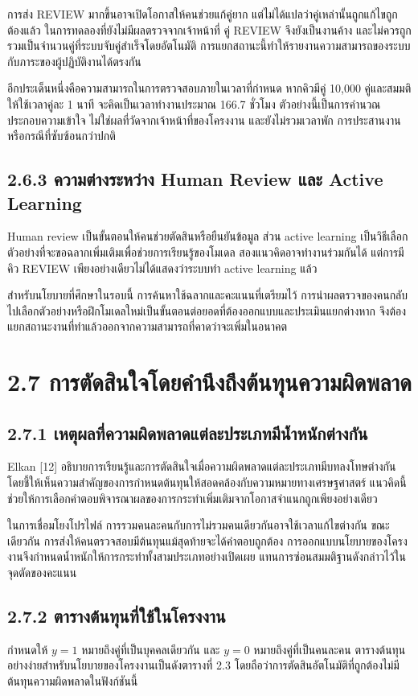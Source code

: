 การส่ง REVIEW มากขึ้นอาจเปิดโอกาสให้คนช่วยแก้คู่ยาก แต่ไม่ได้แปลว่าคู่เหล่านั้นถูกแก้ไขถูกต้องแล้ว ในการทดลองที่ยังไม่มีผลตรวจจากเจ้าหน้าที่ คู่ REVIEW จึงยังเป็นงานค้าง และไม่ควรถูกรวมเป็นจำนวนคู่ที่ระบบจับคู่สำเร็จโดยอัตโนมัติ การแยกสถานะนี้ทำให้รายงานความสามารถของระบบกับภาระของผู้ปฏิบัติงานได้ตรงกัน

อีกประเด็นหนึ่งคือความสามารถในการตรวจสอบภายในเวลาที่กำหนด หากคิวมีคู่ 10,000 คู่และสมมติให้ใช้เวลาคู่ละ 1 นาที จะคิดเป็นเวลาทำงานประมาณ 166.7 ชั่วโมง ตัวอย่างนี้เป็นการคำนวณประกอบความเข้าใจ ไม่ใช่ผลที่วัดจากเจ้าหน้าที่ของโครงงาน และยังไม่รวมเวลาพัก การประสานงาน หรือกรณีที่ซับซ้อนกว่าปกติ

\subsection*{2.6.3 ความต่างระหว่าง Human Review และ Active Learning}
Human review เป็นขั้นตอนให้คนช่วยตัดสินหรือยืนยันข้อมูล ส่วน active learning เป็นวิธีเลือกตัวอย่างที่จะขอฉลากเพิ่มเติมเพื่อช่วยการเรียนรู้ของโมเดล สองแนวคิดอาจทำงานร่วมกันได้ แต่การมีคิว REVIEW เพียงอย่างเดียวไม่ได้แสดงว่าระบบทำ active learning แล้ว

สำหรับนโยบายที่ศึกษาในรอบนี้ การค้นหาใช้ฉลากและคะแนนที่เตรียมไว้ การนำผลตรวจของคนกลับไปเลือกตัวอย่างหรือฝึกโมเดลใหม่เป็นขั้นตอนต่อยอดที่ต้องออกแบบและประเมินแยกต่างหาก จึงต้องแยกสถานะงานที่ทำแล้วออกจากความสามารถที่คาดว่าจะเพิ่มในอนาคต

\section*{2.7 การตัดสินใจโดยคำนึงถึงต้นทุนความผิดพลาด}
\subsection*{2.7.1 เหตุผลที่ความผิดพลาดแต่ละประเภทมีน้ำหนักต่างกัน}
Elkan [12] อธิบายการเรียนรู้และการตัดสินใจเมื่อความผิดพลาดแต่ละประเภทมีบทลงโทษต่างกัน โดยชี้ให้เห็นความสำคัญของการกำหนดต้นทุนให้สอดคล้องกับความหมายทางเศรษฐศาสตร์ แนวคิดนี้ช่วยให้การเลือกคำตอบพิจารณาผลของการกระทำเพิ่มเติมจากโอกาสจำแนกถูกเพียงอย่างเดียว

ในการเชื่อมโยงโปรไฟล์ การรวมคนละคนกับการไม่รวมคนเดียวกันอาจใช้เวลาแก้ไขต่างกัน ขณะเดียวกัน การส่งให้คนตรวจสอบมีต้นทุนแม้สุดท้ายจะได้คำตอบถูกต้อง การออกแบบนโยบายของโครงงานจึงกำหนดน้ำหนักให้การกระทำทั้งสามประเภทอย่างเปิดเผย แทนการซ่อนสมมติฐานดังกล่าวไว้ในจุดตัดของคะแนน

\subsection*{2.7.2 ตารางต้นทุนที่ใช้ในโครงงาน}
กำหนดให้ $y=1$ หมายถึงคู่ที่เป็นบุคคลเดียวกัน และ $y=0$ หมายถึงคู่ที่เป็นคนละคน ตารางต้นทุนอย่างง่ายสำหรับนโยบายของโครงงานเป็นดังตารางที่ 2.3 โดยถือว่าการตัดสินอัตโนมัติที่ถูกต้องไม่มีต้นทุนความผิดพลาดในฟังก์ชันนี้

